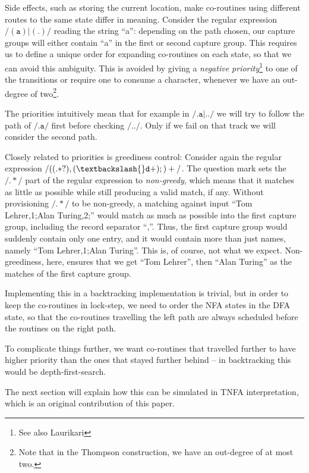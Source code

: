 \documentclass[11pt,a4paper,twoside,openright]{Thesis}
\theoremstyle{definition}
\newcommand{\regex}[1]{\ensuremath{\mathtt{/#1/}}}
\newcommand{\str}[1]{``#1''}
\begin{document}
Side effects, such as storing the current location, make co-routines using
different routes to the same state differ in meaning. Consider the regular
expression \regex{(a)|(.)} reading the string \str{a}: depending on the path
chosen, our capture groups will either contain \str{a} in the first or
second capture group. This requires us to define a unique order for expanding
co-routines on each state, so that we can avoid this ambiguity.
This is avoided by
giving a \emph{negative priority}\footnote{See also Laurikari\cite{Laur00a}} to
one of the transitions or require one to consume a character, whenever we have
an out-degree of two\footnote{Note that in the Thompson construction, we have
an out-degree of at most two.}.

The priorities intuitively mean that for example in \regex{.a|..} we will
try to follow the path of \regex{.a} first before checking \regex{..}.
Only if we fail on that track we will consider the second path.

Closely related to priorities is greediness control: Consider again the regular
expression \regex{((.*?),(\textbackslash{}d+);)+}. The question mark sets the
\regex{.*} part of the regular expression to \emph{non-greedy}, which means
that it matches as little as possible while still producing a valid match, if
any.  Without provisioning \regex{.*} to be non-greedy, a matching against
input \str{Tom Lehrer,1;Alan Turing,2;} would match as much as possible
into the first capture group, including the record separator \str{,}.  Thus, the
first capture group would suddenly contain only one entry, and it would contain
more than just names, namely \str{Tom Lehrer,1;Alan Turing}.  This is, of course,
not what we expect.  Non-greediness, here, ensures that we get \str{Tom Lehrer},
then \str{Alan Turing} as the matches of the first capture group.

Implementing this in a backtracking implementation is trivial, but in order
to keep the co-routines in lock-step, we need to order the NFA states in the
DFA state, so that the co-routines travelling the left path are always
scheduled before the routines on the right path.

To complicate things further, we want co-routines that travelled further to 
have higher priority than the ones that stayed further behind -- in 
backtracking this would be depth-first-search.

The next section will explain how this can be simulated in TNFA interpretation,
which is an original contribution of this paper.
\end{document}

